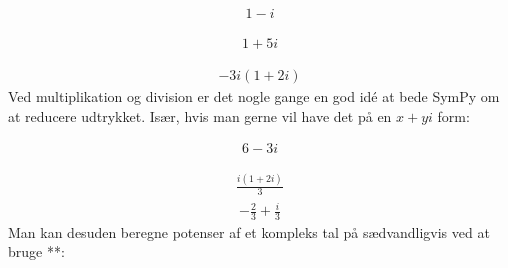 \documentclass[letterpaper,10pt,english]{jupyterBook}
\begin{document}
\begin{sphinxVerbatim}[commandchars=\\\{\}]
      
     
  
\end{sphinxVerbatim}
\begin{equation*}
\begin{split}\displaystyle 1 - i\end{split}
\end{equation*}
\begin{sphinxVerbatim}[commandchars=\\\{\}]
  
\end{sphinxVerbatim}
\begin{equation*}
\begin{split}\displaystyle 1 + 5 i\end{split}
\end{equation*}
\begin{sphinxVerbatim}[commandchars=\\\{\}]
  
\end{sphinxVerbatim}
\begin{equation*}
\begin{split}\displaystyle - 3 i \left(1 + 2 i\right)\end{split}
\end{equation*}
Ved multiplikation og division er det nogle gange en god idé at bede SymPy om at reducere udtrykket. Især, hvis man gerne vil have det på en \(x + yi\) form:

\begin{sphinxVerbatim}[commandchars=\\\{\}]
  
\end{sphinxVerbatim}
\begin{equation*}
\begin{split}\displaystyle 6 - 3 i\end{split}
\end{equation*}
\begin{sphinxVerbatim}[commandchars=\\\{\}]
  
          
\end{sphinxVerbatim}
\begin{equation*}
\begin{split}\displaystyle \frac{i \left(1 + 2 i\right)}{3}\end{split}
\end{equation*}\begin{equation*}
\begin{split}\displaystyle - \frac{2}{3} + \frac{i}{3}\end{split}
\end{equation*}
Man kan desuden beregne potenser af et kompleks tal på sædvandligvis ved at bruge **:
\end{document}
